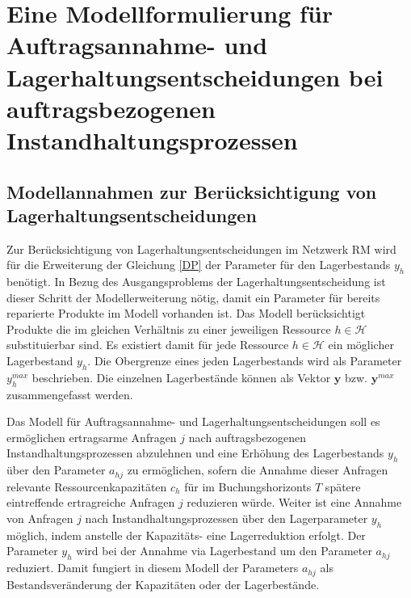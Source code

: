 \chapter{Eine Modellformulierung für Auftragsannahme- und Lagerhaltungsentscheidungen bei auftragsbezogenen Instandhaltungsprozessen}\label{HauptteilDP}
\setcounter{footnote}{86}

\section{Modellannahmen zur Berücksichtigung von Lagerhaltungsentscheidungen}


Zur Berücksichtigung von Lagerhaltungsentscheidungen im Netzwerk RM wird für die Erweiterung der Gleichung \eqref{DP} der Parameter für den Lagerbestands $y_{h}$ benötigt. In Bezug des Ausgangsproblems der Lagerhaltungsentscheidung ist dieser Schritt der Modellerweiterung nötig, damit ein Parameter für bereits reparierte Produkte im Modell vorhanden ist. Das Modell berücksichtigt Produkte die im gleichen Verhältnis zu einer jeweiligen Ressource $h\in\mathcal{H}$ substituierbar sind. Es existiert damit für jede Ressource $h\in\mathcal{H}$ ein möglicher Lagerbestand $y_h$. Die Obergrenze eines jeden Lagerbestands wird als Parameter $y_{h}^{max}$ beschrieben. Die einzelnen Lagerbestände können als Vektor $\textbf{y}$ bzw. $\textbf{y}^{max}$ zusammengefasst werden. %


Das Modell für Auftragsannahme- und Lagerhaltungsentscheidungen soll es ermöglichen ertragsarme Anfragen $j$ nach auftragsbezogenen Instandhaltungsprozessen abzulehnen und eine Erhöhung des Lagerbestands $y_{h}$ über den Parameter $a_{hj}$ zu ermöglichen, sofern die Annahme dieser Anfragen relevante Ressourcenkapazitäten $c_{h}$ für im Buchungshorizonts $T$ spätere eintreffende ertragreiche Anfragen $j$ reduzieren würde. Weiter ist eine Annahme von Anfragen $j$ nach Instandhaltungsprozessen über den Lagerparameter $y_{h}$ möglich, indem anstelle der Kapazitäts- eine Lagerreduktion erfolgt. Der Parameter $y_{h}$ wird bei der Annahme via Lagerbestand um den Parameter $a_{hj}$ reduziert. Damit fungiert in diesem Modell der Parameters $a_{hj}$ als Bestandsveränderung der Kapazitäten oder der Lagerbestände. 

